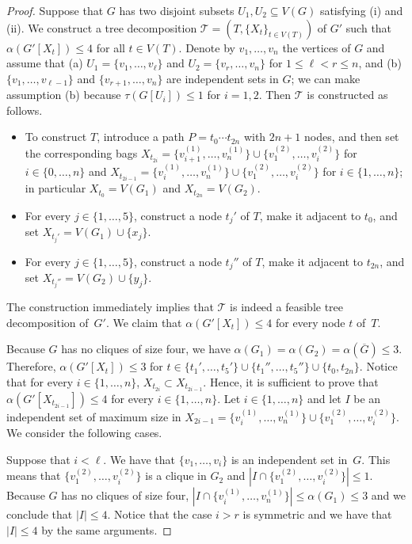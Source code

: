 \documentclass[11pt]{article}
\theoremstyle{definition}
\begin{document}
\begin{proof}
Suppose that  $G$ has two disjoint subsets $U_1,U_2\subseteq V(G)$ satisfying (i) and (ii).  We construct a tree decomposition  $\mathcal{T} = (T, \{X_t\}_{t\in V(T)})$ of  $G'$ such that $\alpha(G'[X_t])\leq 4$ for all $t\in V(T)$.
Denote by $v_1,\ldots,v_n$ the vertices of $G$ and assume that (a) $U_1=\{v_1,\ldots,v_\ell\}$ and $U_2=\{v_r,\ldots,v_n\}$ for $1\leq\ell<r\leq n$, and (b) $\{v_1,\ldots,v_{\ell-1}\}$ and $\{v_{r+1},\ldots,v_n\}$ are independent sets in $G$; we can make assumption (b) because $\tau(G[U_i])\leq 1$ for $i=1,2$.
Then $\mathcal{T}$ is constructed as follows.
\begin{itemize}
\item To construct $T$, introduce a path $P=t_0\cdots t_{2n}$ with $2n+1$ nodes, and then set the corresponding bags  $X_{t_{2i}}=\{v_{i+1}^{(1)},\ldots,v_n^{(1)}\}\cup\{v_1^{(2)},\ldots,v_{i}^{(2)}\}$ for $i\in\{0,\ldots,n\}$ and
$X_{t_{2i-1}}=\{v_i^{(1)},\ldots,v_n^{(1)}\}\cup\{v_1^{(2)},\ldots,v_{i}^{(2)}\}$ for $i\in\{1,\ldots,n\}$; in particular $X_{t_0}=V(G_1)$ and $X_{t_{2n}}=V(G_2)$.
\item For every $j\in\{1,\ldots,5\}$, construct a node $t_j'$ of $T$, make it adjacent to $t_0$, and set $X_{t_j'}=V(G_1)\cup\{x_j\}$.
\item For every $j\in\{1,\ldots,5\}$, construct a node $t_j''$ of $T$, make it adjacent to $t_{2n}$, and set $X_{t_j''}=V(G_2)\cup\{y_j\}$.
\end{itemize}
The construction immediately implies that $\mathcal{T}$ is indeed a  feasible tree decomposition of~$G'$. We claim that $\alpha(G'[X_t])\leq 4$ for every node $t$ of~$T$.

Because $G$ has no cliques of size four, we have $\alpha(G_1)=\alpha(G_2)=\alpha(\overline{G})\leq 3$.
Therefore, $\alpha(G'[X_t])\leq 3$ for $t\in\{t_1',\ldots,t_5'\}\cup\{t_1'',\ldots,t_5''\}\cup\{t_0,t_{2n}\}$. 
Notice that for every $i\in\{1,\ldots,n\}$, $X_{t_{2i}}\subset X_{t_{2i-1}}$.
Hence, it is sufficient to prove that $\alpha(G'[X_{t_{2i-1}}])\leq 4$ for every $i\in\{1,\ldots,n\}$.
Let $i\in\{1,\ldots,n\}$ and let $I$ be an independent set of maximum size in $X_{2i-1}=\{v_i^{(1)},\ldots,v_n^{(1)}\}\cup\{v_1^{(2)},\ldots,v_{i}^{(2)}\}$.
We consider the following cases.

Suppose that $i<\ell$. We have that $\{v_1,\ldots,v_i\}$ is an independent set in~$G$. This means that  $\{v_1^{(2)},\ldots,v_{i}^{(2)}\}$ is a clique in $G_2$ and $|I\cap \{v_1^{(2)},\ldots,v_{i}^{(2)}\}|\leq 1$.  Because $G$ has no cliques of size four, $|I\cap \{v_i^{(1)},\ldots,v_n^{(1)}\}|\leq \alpha(G_1)\leq 3$ and we conclude that $|I|\leq 4$. Notice that the case $i>r$ is symmetric and we have that $|I|\leq 4$ by the same arguments.


\end{proof}
\end{document}
